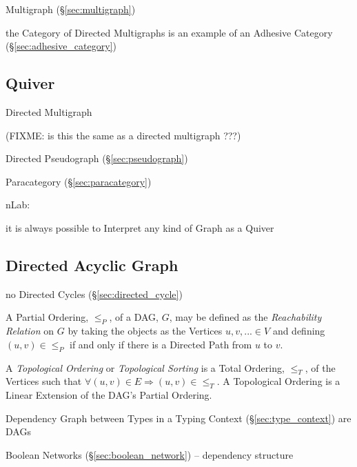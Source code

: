 Multigraph (\S\ref{sec:multigraph})

the Category of Directed Multigraphs is an example of an Adhesive Category
(\S\ref{sec:adhesive_category})



\subsection{Quiver}\label{sec:quiver}

Directed Multigraph

(FIXME: is this the same as a directed multigraph ???)

Directed Pseudograph (\S\ref{sec:pseudograph})

Paracategory (\S\ref{sec:paracategory})

nLab:

it is always possible to Interpret any kind of Graph as a Quiver



\subsection{Directed Acyclic Graph}\label{sec:dag}

no Directed Cycles (\S\ref{sec:directed_cycle})

A Partial Ordering, $\leq_P$, of a DAG, $G$, may be defined as the
\emph{Reachability Relation} on $G$ by taking the objects as the
Vertices $u,v,... \in V$ and defining $(u,v) \in \leq_P$ if and only
if there is a Directed Path from $u$ to $v$.

A \emph{Topological Ordering} or \emph{Topological Sorting} is a Total
Ordering, $\leq_T$, of the Vertices such that $\forall (u,v) \in E
\Rightarrow (u,v) \in \leq_T$. A Topological Ordering is a Linear
Extension of the DAG's Partial Ordering. %

Dependency Graph between Types in a Typing Context (\S\ref{sec:type_context})
are DAGs

\fist Boolean Networks (\S\ref{sec:boolean_network}) -- dependency structure



